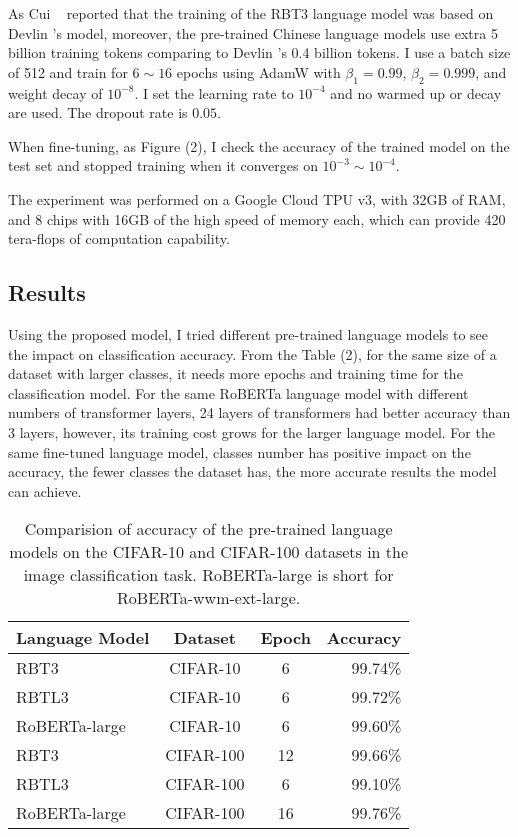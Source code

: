\documentclass[review]{cvpr}
\begin{document}
As Cui \etal~\cite{cui2020revisiting} reported that the training of the RBT3 language model was based on Devlin \etal's model,
moreover, the pre-trained Chinese language models use extra 5 billion training tokens comparing to Devlin \etal's 0.4 billion tokens.
I use a batch size of 512 and train for $6\sim16$ epochs using AdamW with $\beta_1=0.99$, $\beta_2=0.999$, and weight decay of $10^{-8}$.
I set the learning rate to $10^{-4}$ and no warmed up or decay are used.
The dropout rate is $0.05$.

\par When fine-tuning, as Figure (2), I check the accuracy of the trained model on the test set and stopped training when it converges on $10^{-3}\sim10^{-4}$.

\par The experiment was performed on a Google Cloud TPU v3, with 32GB of RAM, and 8 chips with 16GB of the high speed of memory each,
which can provide 420 tera-flops of computation capability.

\subsection{Results}

Using the proposed model, I tried different pre-trained language models to see the impact on classification accuracy.
From the Table (2), for the same size of a dataset with larger classes, it needs more epochs and training time for the classification model.
For the same RoBERTa language model with different numbers of transformer layers, 24 layers of transformers had better accuracy than 3 layers,
however, its training cost grows for the larger language model.
For the same fine-tuned language model, classes number has positive impact on the accuracy,
the fewer classes the dataset has, the more accurate results the model can achieve.


\begin{table}
\begin{center}
\begin{tabular}{|l|c|c|r|}
\hline
Language Model 	& Dataset & Epoch & Accuracy \\
\hline\hline
RBT3   & CIFAR-10 & 6	&	99.74\% \\
RBTL3  & CIFAR-10 & 6	&	99.72\% \\
RoBERTa-large  & CIFAR-10 & 6	&	99.60\% \\
\hline
RBT3   & CIFAR-100 & 12	&	99.66\% \\
RBTL3  & CIFAR-100 & 6  & 	99.10\% \\
RoBERTa-large & CIFAR-100 & 16 &	99.76\% \\
\hline
\end{tabular}
\end{center}
\caption{Comparision of accuracy of the pre-trained language models on the CIFAR-10 and CIFAR-100 datasets in the image classification task.
RoBERTa-large is short for RoBERTa-wwm-ext-large.}
\end{table}
\end{document}
